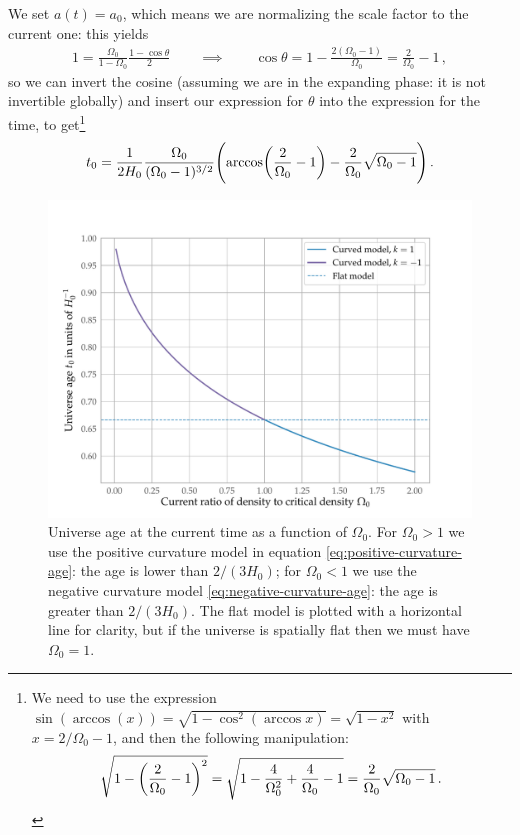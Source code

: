 \documentclass[main.tex]{subfiles}
\begin{document}
We set \(a(t) = a_0 \), which means we are normalizing the scale factor to the current one: this yields 
%
\begin{align}
1= \frac{\Omega_0}{1-\Omega_0 } \frac{1 - \cos \theta }{2}
\qquad \implies \qquad
\cos \theta = 1 - \frac{2 (\Omega_0 -1)}{\Omega_0 } = \frac{2}{\Omega_0 }-1
\,,
\end{align}
%
so we can invert the cosine (assuming we are in the expanding phase: it is not invertible globally) and insert our expression for \(\theta \) into the expression for the time, to get\footnote{We need to use the expression \(\sin(
\arccos(x)) = \sqrt{1- \cos^2(\arccos x)} = \sqrt{1- x^2}\) with \(x = 2/ \Omega_0 -1\), and then the following manipulation: 
%
\begin{align}
\sqrt{1 - \qty(\frac{2}{\Omega_0 }-1)^2} = \sqrt{1 - \frac{4}{\Omega_0^2} + \frac{4}{\Omega_0} -1}
= \frac{2}{\Omega_0 } \sqrt{\Omega_0 -1 }
\,.
\end{align}}
%
\begin{equation} \label{eq:positive-curvature-age}
  t_0 = \frac{1}{2H_0 } \frac{\Omega_0  }{(\Omega_0 -1)^{3/2}} \qty(\arccos (\frac{2}{\Omega_0 }-1) - \frac{2}{\Omega_0 } \sqrt{\Omega_0 -1 })
\,.
\end{equation}

\begin{figure}[ht]
\centering
\includegraphics[width=\textwidth]{figures/curved_universe_age}
\caption{Universe age at the current time as a function of \(\Omega_0 \). For \(\Omega_0>1\) we use the positive curvature model in equation \eqref{eq:positive-curvature-age}: the age is lower than \(2/(3H_0 )\); for \(\Omega_0 <1\) we use the negative curvature model \eqref{eq:negative-curvature-age}: the age is greater than \(2/(3H_0 )\).
The flat model is plotted with a horizontal line for clarity, but if the universe is spatially flat then we must have \(\Omega_0 =1\).}
\label{fig:curved_universe_age}
\end{figure}
\end{document}

